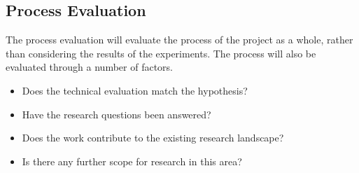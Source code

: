 \subsection{Process Evaluation}
The process evaluation will evaluate the process of the project as a whole, rather than considering the results of the experiments. The process will also be evaluated through a number of factors.

\begin{itemize}
    \item Does the technical evaluation match the hypothesis?
    \item Have the research questions been answered?
    \item Does the work contribute to the existing research landscape?
    \item Is there any further scope for research in this area?
\end{itemize}